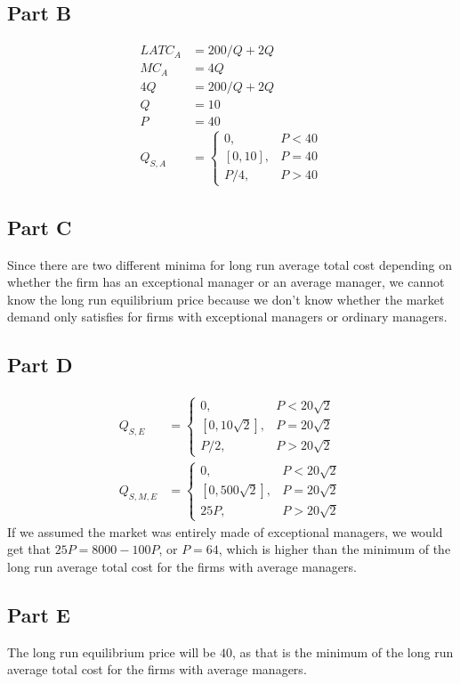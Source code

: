 \documentclass[8pt]{extarticle}
\begin{document}
{\subsection*{Part B}
\begin{align*}
	LATC_{A} &= 200/Q + 2Q \\
	MC_{A} &= 4Q \\
	4Q &= 200/Q + 2Q \\
	Q &= 10\\
	P &= 40\\
	Q_{S,A} &= \begin{cases}
		0, &P<40 \\
		[0,10], &P=40\\
		P/4, & P>40
	\end{cases}
\end{align*}
\subsection*{Part C}
Since there are two different minima for long run average total cost depending on whether the firm has an exceptional manager or an average manager, we cannot know the long run equilibrium price because we don't know whether the market demand only satisfies for firms with exceptional managers or ordinary managers.
\subsection*{Part D}
\begin{align*}
	Q_{S,E} &= \begin{cases}
		0, & P < 20\sqrt{2}\\
		[0,10\sqrt{2}], & P = 20\sqrt{2} \\
		P/2, &P>20\sqrt{2}
	\end{cases} \\
	Q_{S,M,E} &= \begin{cases}
		0, & P<20\sqrt{2} \\
		[0,500\sqrt{2}], &P = 20\sqrt{2} \\
		25P, & P>20\sqrt{2}
	\end{cases}
\end{align*}
If we assumed the market was entirely made of exceptional managers, we would get that $25P = 8000-100P$, or $P = 64$, which is higher than the minimum of the long run average total cost for the firms with average managers.
\subsection*{Part E}
The long run equilibrium price will be $40$, as that is the minimum of the long run average total cost for the firms with average managers.
}
\end{document}
